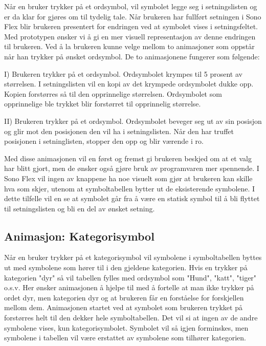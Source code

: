 { 
Når en bruker trykker på et ordsymbol, vil symbolet legge seg i setningslisten og er da klar for gjøres om til tydelig tale. Når brukeren har fullført setningen i Sono Flex blir brukeren presentert for endringen ved at symbolet vises i setningsfeltet. Med prototypen ønsker vi  å gi en mer visuell representasjon av denne endringen til brukeren. Ved å la brukeren kunne velge mellom to animasjoner som oppstår når han trykker på ønsket ordsymbol. De to animasjonene fungerer som følgende: 
 
 
 
 
I) Brukeren trykker på et ordsymbol. 
   Ordsymbolet krympes til 5 prosent av størrelsen. 
   I setningslisten vil en kopi av det krympede ordsymbolet dukke opp. 
   Kopien forstørres så til den opprinnelige størrelsen. 
   Ordsymbolet som opprinnelige ble trykket blir forstørret til opprinnelig størrelse. 
 
 
    
II) Brukeren trykker på et ordsymbol. 
    Ordsymbolet beveger seg ut av sin posisjon og glir mot den posisjonen den vil ha i setningslisten. 
    Når den har truffet posisjonen i setninglisten, stopper den opp og blir værende i ro. 
 
 
    Med disse animasjonen vil en først og fremst gi brukeren beskjed om at et valg har blitt gjort, men de ønsker også gjøre bruk av programvaren mer spennende.  I Sono Flex  vil ingen av knappene ha noe visuelt som gjør at brukeren kan skille hva som skjer, utenom at symboltabellen bytter ut de eksisterende symbolene. I dette tilfelle vil en se at symbolet går fra å være en statisk symbol til å bli flyttet til setningslisten og bli en del av ønsket setning.  
 
 
 
 
 
 
\subsection{Animasjon: Kategorisymbol} 
 
 
Når en bruker trykker på et kategorisymbol vil symbolene i symboltabellen byttes ut med symbolene som hører til i den gjeldene kategorien. Hvis en trykker på kategorien "dyr" så vil tabellen fylles med ordsymbol som "Hund", "katt", "tiger" o.s.v. Her ønsker animasjonen å hjelpe til med å fortelle at man ikke trykker på ordet dyr, men kategorien dyr og at brukeren får en forståelse for forskjellen mellom dem. Animasjonen startet ved at symbolet som brukeren trykket på forstørres helt til den dekker hele symboltabellen. Det vil si at ingen av de andre symbolene vises, kun kategorisymbolet. Symbolet vil så igjen forminskes, men symbolene i tabellen vil være erstattet av symbolene som tilhører kategorien.  
 
}
